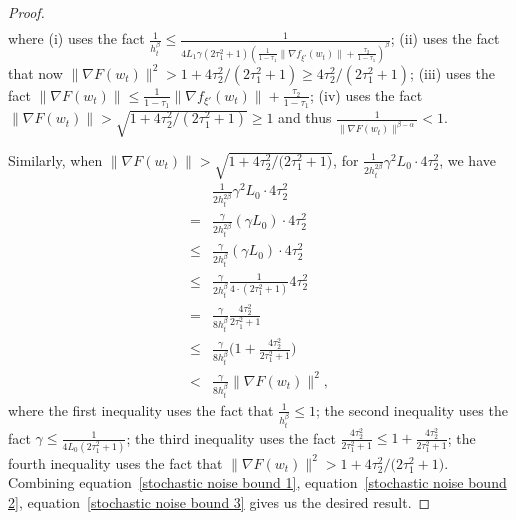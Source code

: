 \documentclass[10pt]{article} %
\def\eqref#1{equation~\ref{#1}}
\newtheorem{proof}{Proof}
\begin{document}
\begin{proof}
\begin{align}
        \label{stochastic noise bound 2}
    \end{align}
        where (i) uses the fact $\frac{1}{h_t^{\beta}}\leq \frac{1}{4L_1\gamma(2\tau_1^2+1)(\frac{1}{1-\tau_1}\|\nabla f_{\xi'}(w_t) \|+\frac{\tau_2}{1-\tau_1})^{\beta}}$;
        (ii) uses the fact that now $\|\nabla F(w_t) \|^2> 1+{4\tau_2^2}/{(2\tau_1^2+1)}\geq {4\tau_2^2}/{(2\tau_1^2+1)}$;
     (iii) uses the fact $\|\nabla F(w_t) \|\leq \frac{1}{1-\tau_1}\|\nabla f_{\xi'}(w_t) \|+\frac{\tau_2}{1-\tau_1}$; (iv) uses the fact $\big \|\nabla F(w_t) \big \| > \sqrt{1+{4\tau_2^2}/{(2\tau_1^2+1)}}\geq 1$ and thus $\frac{1}{\|\nabla F(w_t)  \|^{\beta-\alpha}}<1$.
    
    Similarly, when $\big \|\nabla F(w_t) \big \| > \sqrt{1+{4\tau_2^2}/{(2\tau_1^2+1})}$,  for $\frac{1}{2h_t^{2\beta}}\gamma^2 L_0 \cdot 4\tau_2^2$, we have
    \begin{align}
       &\frac{1}{2h_t^{2\beta}}\gamma^2 L_0 \cdot 4\tau_2^2 \nonumber\\
       =&\frac{\gamma}{2h_t^{2\beta}}(\gamma L_0) \cdot 4\tau_2^2 \nonumber\\
       \leq& \frac{\gamma}{2h_t^{\beta}}(\gamma L_0) \cdot 4\tau_2^2 \nonumber\\
       \leq& \frac{\gamma}{2h_t^{\beta}} \frac{1}{4\cdot(2\tau_1^2+1)}4\tau_2^2 \nonumber \\
       =& \frac{\gamma}{8h_t^{\beta}} \frac{4\tau_2^2}{2\tau_1^2+1} \nonumber \\
       \leq& \frac{\gamma}{8h_t^{\beta}} \Big(1+\frac{4\tau_2^2}{2\tau_1^2+1} \Big)\nonumber \\
       <& \frac{\gamma}{8h_t^{\beta}} \big \|\nabla F(w_t) \big \|^2,
       \label{stochastic noise bound 3}
    \end{align}
        where the first inequality uses the fact that $\frac{1}{h_t^{\beta}}\leq 1$; the second inequality uses the fact $\gamma \leq \frac{1}{4L_0(2\tau_1^2+1)}$; the third inequality uses the fact $\frac{4\tau_2^2}{2\tau_1^2+1}\leq 1+\frac{4\tau_2^2}{2\tau_1^2+1}$; the fourth inequality uses the fact that
        $\big \|\nabla F(w_t) \big \|^2 > 1+{4\tau_2^2}/{(2\tau_1^2}+1)$.
        Combining \eqref{stochastic noise bound 1}, \eqref{stochastic noise bound 2}, \eqref{stochastic noise bound 3} gives us the desired result.
\end{proof}
\end{document}
